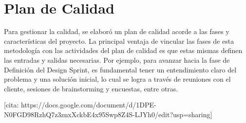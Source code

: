 \section{Plan de Calidad}\label{sec:planDeCalidad}

Para gestionar la calidad, se elaboró un plan de calidad acorde a las fases y características del proyecto. 
La principal ventaja de vincular las fases de esta metodología con las actividades del plan de calidad es que 
estas mismas definen las entradas y salidas necesarias. Por ejemplo, para avanzar hacia la fase de Definición del 
Design Sprint, es fundamental tener un entendimiento claro del problema y una solución inicial, lo cual se logra a 
través de reuniones con el cliente, sesiones de brainstorming y encuestas, entre otras.

[cita: https://docs.google.com/document/d/1DPE-N0FGD98RzhQ7z3znxXckbE4x95Swp8Z4S-LJYh0/edit?usp=sharing]

